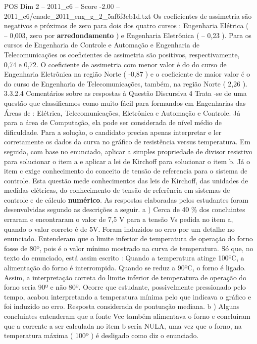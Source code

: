 \begin{textsample}{POS Dim 2 – 2011\_c6 – Score -2.00 – 2011\_c6/enade\_2011\_eng\_g\_2\_5af6f3cb1d.txt}
Os coeficientes de assimetria são negativos e próximos de zero para dois dos quatro cursos : Engenharia Elétrica ( – 0,003, zero por \textbf{arredondamento} ) e Engenharia Eletrônica ( – 0,23 ).
Para os cursos de Engenharia de Controle e Automação e Engenharia de Telecomunicações os coeficientes de assimetria são positivos, respectivamente, 0,74 e 0,72.
O coeficiente de assimetria com menor valor é do do curso de Engenharia Eletrônica na região Norte ( -0,87 ) e o coeficiente de maior valor é o do curso de Engenharia de Telecomunicações, também, na região Norte ( 2,26 ). 3.3.2.4 Comentários sobre as respostas à Questão Discursiva 4 Trata -se de uma questão que classificamos como muito fácil para formandos em Engenharias das Áreas de : Elétrica, Telecomunicações, Eletrônica e Automação e Controle.
Já para a área de Computação, ela pode ser considerada de nível médio de dificuldade.
Para a solução, o candidato precisa apenas interpretar e ler corretamente os dados da curva no gráfico de resistência versus temperatura.
Em seguida, com base no enunciado, aplicar a simples propriedade de divisor resistivo para solucionar o item a e aplicar a lei de Kirchoff para solucionar o item b.
Já o item c exige conhecimento do conceito de tensão de referencia para o sistema de controle.
Esta questão mede conhecimentos das leis de Kirchoff, das unidades de medidas elétricas, do conhecimento de tensão de referência em sistemas de controle e de cálculo \textbf{numérico}.
As respostas elaboradas pelos estudantes foram desenvolvidas segundo as descrições a seguir. a ) Cerca de 40 \% dos concluintes erraram e encontraram o valor de 7,5 V para a tensão Vs pedida no item a, quando o valor correto é de 5V.
Foram induzidos ao erro por um detalhe no enunciado.
Entenderam que o limite inferior de temperatura de operação do forno fosse de 80º, pois é o valor mínimo mostrado na curva de temperatura.
Só que, no texto do enunciado, está assim escrito : Quando a temperatura atinge 100ºC, a alimentação do forno é interrompida.
Quando se reduz a 90ºC, o forno é ligado.
Assim, a interpretação correta do limite inferior de temperatura de operação do forno seria 90º e não 80º.
Ocorre que estudante, possivelmente pressionado pelo tempo, acabou interpretando a temperatura mínima pelo que indicava o gráfico e foi induzido ao erro.
Resposta considerada de pontuação mediana. b ) Alguns concluintes entenderam que a fonte Vcc também alimentava o forno e concluíram que a corrente a ser calculada no item b seria NULA, uma vez que o forno, na temperatura máxima ( 100º ) é desligado como diz o enunciado.

\end{textsample}
